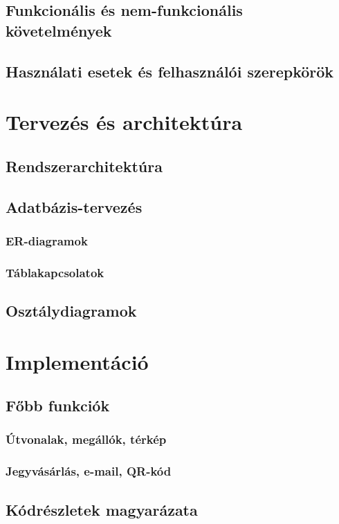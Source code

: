 \subsection{Funkcionális és nem-funkcionális követelmények}
\subsection{Használati esetek és felhasználói szerepkörök}

\section{Tervezés és architektúra}

\subsection{Rendszerarchitektúra}
\subsection{Adatbázis-tervezés}
\subsubsection{ER-diagramok}
\subsubsection{Táblakapcsolatok}
\subsection{Osztálydiagramok}

\section{Implementáció}

\subsection{Főbb funkciók}
\subsubsection{Útvonalak, megállók, térkép}
\subsubsection{Jegyvásárlás, e-mail, QR-kód}
\subsection{Kódrészletek magyarázata}
